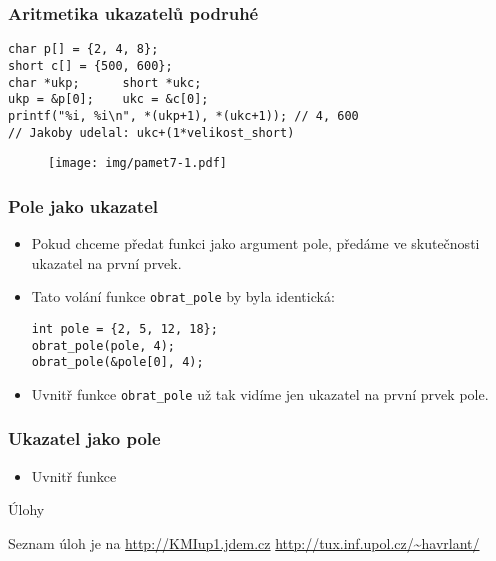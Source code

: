 \documentclass{beamer}
\newenvironment{itemizex}%
  {\large \begin{itemize}%
    \setlength{\itemsep}{8pt}%
    \setlength{\parskip}{8pt}}%
  {\end{itemize}}
\begin{document}
\begin{frame}[t,fragile]\frametitle{Aritmetika ukazatelů podruhé} 
\begin{verbatim} 
char p[] = {2, 4, 8};
short c[] = {500, 600};
char *ukp;      short *ukc;
ukp = &p[0];    ukc = &c[0];
printf("%i, %i\n", *(ukp+1), *(ukc+1)); // 4, 600
// Jakoby udelal: ukc+(1*velikost_short)
\end{verbatim}

\begin{figure}[htb]
    \centering
    \texttt{[image: img/pamet7-1.pdf]}
\end{figure}
\end{frame}

\begin{frame}[t,fragile]\frametitle{Pole jako ukazatel} 
    \begin{itemizex}
        \item Pokud chceme předat funkci jako argument pole, předáme ve skutečnosti ukazatel na první prvek.
        \item Tato volání funkce \texttt{obrat\_pole} by byla identická:
\begin{verbatim} 
int pole = {2, 5, 12, 18};
obrat_pole(pole, 4);
obrat_pole(&pole[0], 4);
\end{verbatim}
    \item Uvnitř funkce \texttt{obrat\_pole} už tak vidíme jen ukazatel na první prvek pole.
    \end{itemizex}
\end{frame}


\begin{frame}[t,fragile]\frametitle{Ukazatel jako pole} 
    \begin{itemizex}
        \item Uvnitř funkce
    \end{itemizex}
\end{frame}


\begin{frame}[t,fragile]{Úlohy}
\begin{center}
\vskip 1cm
{\Large Seznam úloh je na \url{http://KMIup1.jdem.cz}}
\vskip 2cm
\url{http://tux.inf.upol.cz/~havrlant/}
\end{center}
\end{frame}
\end{document}
